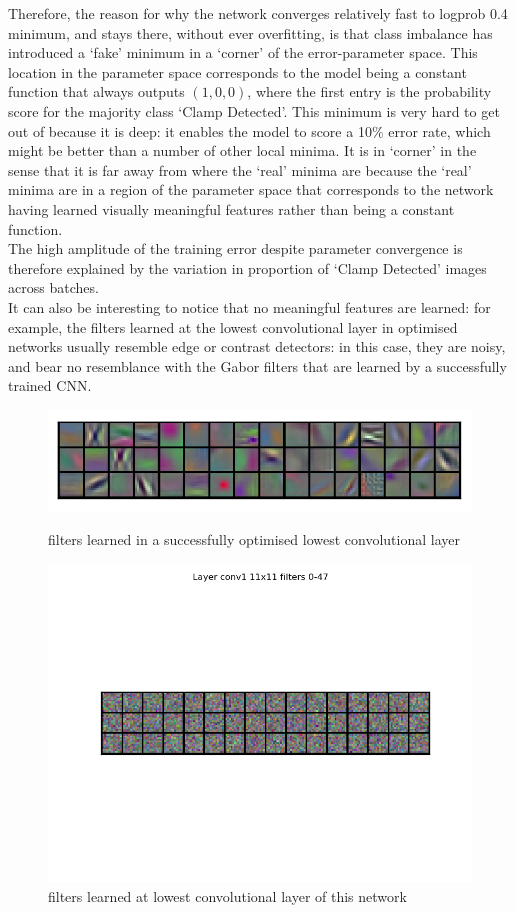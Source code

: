 \documentclass[a4paper,11pt]{article}
\begin{document}
Therefore, the reason for why the network converges relatively fast to logprob 0.4 minimum, and stays there, without ever overfitting, is that class imbalance has introduced a `fake' minimum in a `corner' of the error-parameter space. This location in the parameter space corresponds to the model being a constant function that always outputs $(1, 0, 0)$, where the first entry is the probability score for the majority class `Clamp Detected'. This minimum is very hard to get out of because it is deep: it enables the model to score a 10\% error rate, which might be better than a number of other local minima. It is in  `corner' in the sense that it is far away from where the `real' minima are because the `real' minima are in a region of the parameter space that corresponds to the network having learned visually meaningful features rather than being a constant function. \\

The high amplitude of the training error despite parameter convergence is therefore explained by the variation in proportion of `Clamp Detected' images across batches. \\

It can also be interesting to notice that no meaningful features are learned: for example, the filters learned at the lowest convolutional layer in optimised networks usually resemble edge or contrast detectors: in this case, they are noisy, and bear no resemblance with the Gabor filters that are learned by a successfully trained CNN. 

\begin{figure}[h!]
	\centering
	\includegraphics[scale=0.5]{images/good_filters.png} %
	\caption{filters learned in a successfully optimised lowest convolutional layer} 
	\includegraphics[scale=0.5]{images/bad_filters.png}  %
	\caption{filters learned at lowest convolutional layer of this network}
\end{figure}
\end{document}
